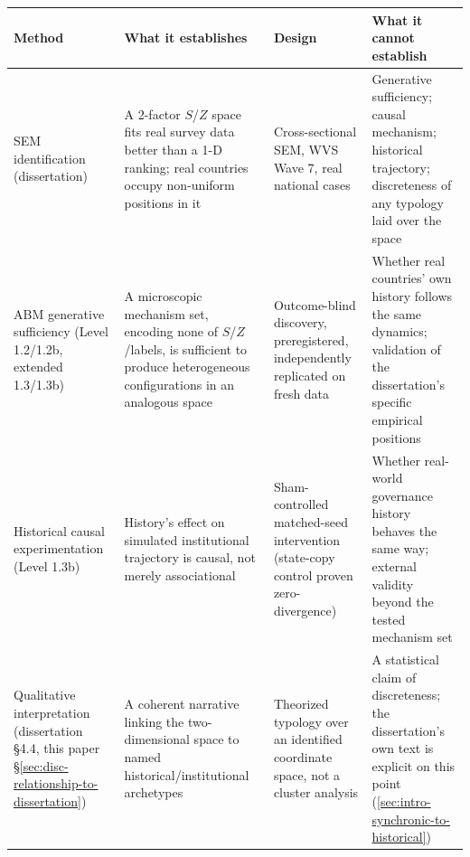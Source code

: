 \begin{tabular}{@{}p{2.6cm}p{4.0cm}p{4.0cm}p{4.2cm}@{}}
\toprule
\textbf{Method} & \textbf{What it establishes} & \textbf{Design} & \textbf{What it cannot establish} \\
\midrule
SEM identification (dissertation) & A 2-factor $S$/$Z$ space fits real survey data better than a 1-D ranking; real countries occupy non-uniform positions in it & Cross-sectional SEM, WVS Wave 7, real national cases & Generative sufficiency; causal mechanism; historical trajectory; discreteness of any typology laid over the space \\
ABM generative sufficiency (Level 1.2/1.2b, extended 1.3/1.3b) & A microscopic mechanism set, encoding none of $S$/$Z$/labels, is sufficient to produce heterogeneous configurations in an analogous space & Outcome-blind discovery, preregistered, independently replicated on fresh data & Whether real countries' own history follows the same dynamics; validation of the dissertation's specific empirical positions \\
Historical causal experimentation (Level 1.3b) & History's effect on simulated institutional trajectory is causal, not merely associational & Sham-controlled matched-seed intervention (state-copy control proven zero-divergence) & Whether real-world governance history behaves the same way; external validity beyond the tested mechanism set \\
Qualitative interpretation (dissertation \S4.4, this paper \S\ref{sec:disc-relationship-to-dissertation}) & A coherent narrative linking the two-dimensional space to named historical/institutional archetypes & Theorized typology over an identified coordinate space, not a cluster analysis & A statistical claim of discreteness; the dissertation's own text is explicit on this point (\cref{sec:intro-synchronic-to-historical}) \\
\bottomrule
\end{tabular}
